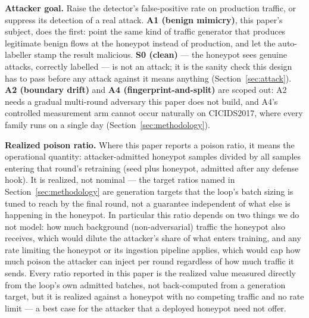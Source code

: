 \textbf{Attacker goal.} Raise the detector's false-positive rate on production traffic, or
suppress its detection of a real attack. \textbf{A1 (benign mimicry)}, this paper's subject,
does the first: point the same kind of traffic generator that produces legitimate benign flows
at the honeypot instead of production, and let the auto-labeller stamp the result malicious.
\textbf{S0 (clean)} — the honeypot sees genuine attacks, correctly labelled — is not an attack;
it is the sanity check this design has to pass before any attack against it means anything
(Section~\ref{sec:attack}). \textbf{A2 (boundary drift)} and \textbf{A4 (fingerprint-and-split)}
are scoped out: A2 needs a gradual multi-round adversary this paper does not build, and A4's
controlled measurement arm cannot occur naturally on CICIDS2017, where every family runs on a
single day (Section~\ref{sec:methodology}).

\textbf{Realized poison ratio.} Where this paper reports a poison ratio, it means the operational
quantity: attacker-admitted honeypot samples divided by all samples entering that round's
retraining (seed plus honeypot, admitted after any defense hook). It is realized, not nominal —
the target ratios named in Section~\ref{sec:methodology} are generation targets that the loop's
batch sizing is tuned to reach by the final round, not a guarantee independent of what else is
happening in the honeypot. In particular this ratio depends on two things we do not model: how
much background (non-adversarial) traffic the honeypot also receives, which would dilute the
attacker's share of what enters training, and any rate limiting the honeypot or its ingestion
pipeline applies, which would cap how much poison the attacker can inject per round regardless of
how much traffic it sends. Every ratio reported in this paper is the realized value measured
directly from the loop's own admitted batches, not back-computed from a generation target, but
it is realized against a honeypot with no competing traffic and no rate limit — a best case for
the attacker that a deployed honeypot need not offer.

